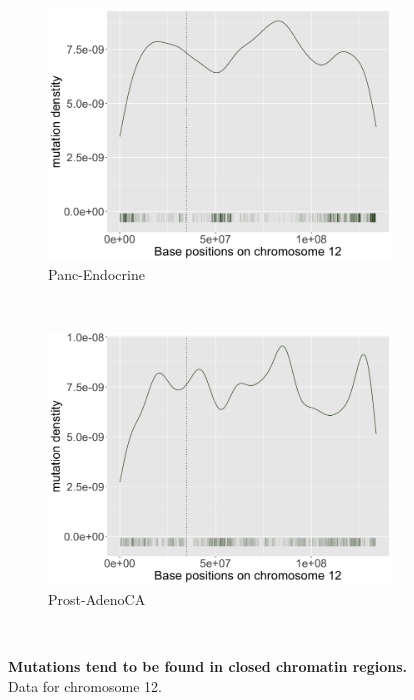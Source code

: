 \begin{figure}[ht!]
    \begin{subfigure}{.5\textwidth}
    \includegraphics[width=\linewidth,height=0.6\textwidth]{graphics/mutdistribution_Panc-Endocrine.png}
    \caption{Panc-Endocrine}
    \end{subfigure} 
    ~
    \begin{subfigure}{.5\textwidth}
    \includegraphics[width=\linewidth,height=0.6\textwidth]{graphics/mutdistribution_Prost-AdenoCA.png}
    \caption{Prost-AdenoCA}
    \end{subfigure} \\

    \caption{\textbf{Mutations tend to be found in closed chromatin regions.} Data for chromosome 12.}
    \label{fig:apdx_mutation_density}
\end{figure}
